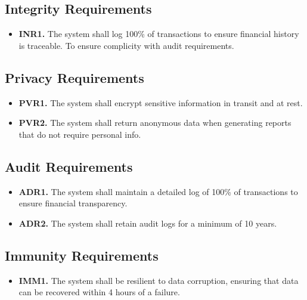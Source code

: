 \documentclass[12pt]{article}
\begin{document}
\subsection{Integrity Requirements}

\label{INR}

\begin{itemize}
    \item \textbf{INR1.} The system shall log 100\% of transactions to ensure financial history is traceable. To ensure complicity with audit requirements.
\end{itemize}
\subsection{Privacy Requirements}

\label{PVR}

\begin{itemize}
    \item \textbf{PVR1.} The system shall encrypt sensitive information in transit and at rest.
    \item \textbf{PVR2.} The system shall return anonymous data when generating reports that do not require personal info.
\end{itemize}
\subsection{Audit Requirements}

\label{ADR}

\begin{itemize}
    \item \textbf{ADR1.} The system shall maintain a detailed log of 100\% of transactions to ensure financial transparency.
    \item \textbf{ADR2.} The system shall retain audit logs for a minimum of 10 years.
\end{itemize}
\subsection{Immunity Requirements}

\label{IMM}

\begin{itemize}
    \item \textbf{IMM1.} The system shall be resilient to data corruption, ensuring that data can be recovered within 4 hours of a failure.
\end{itemize}
\end{document}
